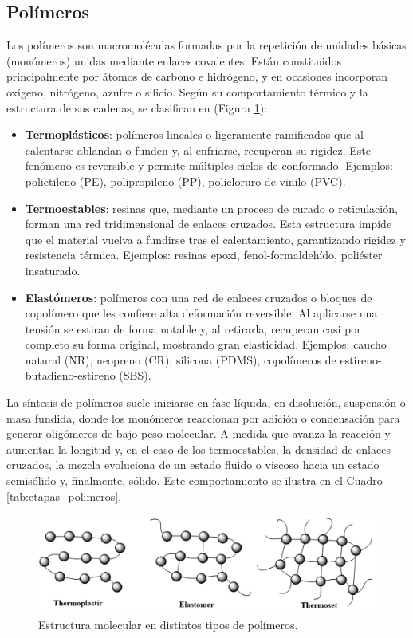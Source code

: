 \subsection{Polímeros}

Los polímeros son macromoléculas formadas por la repetición de unidades básicas (monómeros) unidas mediante enlaces covalentes. Están constituidos principalmente por átomos de carbono e hidrógeno, y en ocasiones incorporan oxígeno, nitrógeno, azufre o silicio. Según su comportamiento térmico y la estructura de sus cadenas, se clasifican en (Figura \ref{plmrs}):

\begin{itemize}
  \item \textbf{Termoplásticos}: polímeros lineales o ligeramente ramificados que al calentarse ablandan o funden y, al enfriarse, recuperan su rigidez. Este fenómeno es reversible y permite múltiples ciclos de conformado. Ejemplos: polietileno (PE), polipropileno (PP), policloruro de vinilo (PVC).
  \item \textbf{Termoestables}: resinas que, mediante un proceso de curado o reticulación, forman una red tridimensional de enlaces cruzados. Esta estructura impide que el material vuelva a fundirse tras el calentamiento, garantizando rigidez y resistencia térmica. Ejemplos: resinas epoxi, fenol-formaldehído, poliéster insaturado.
  \item \textbf{Elastómeros}: polímeros con una red de enlaces cruzados o bloques de copolímero que les confiere alta deformación reversible. Al aplicarse una tensión se estiran de forma notable y, al retirarla, recuperan casi por completo su forma original, mostrando gran elasticidad. Ejemplos: caucho natural (NR), neopreno (CR), silicona (PDMS), copolímeros de estireno-butadieno-estireno (SBS).
\end{itemize}

La síntesis de polímeros suele iniciarse en fase líquida, en disolución, suspensión o masa fundida, donde los monómeros reaccionan por adición o condensación para generar oligómeros de bajo peso molecular. A medida que avanza la reacción y aumentan la longitud y, en el caso de los termoestables, la densidad de enlaces cruzados, la mezcla evoluciona de un estado fluido o viscoso hacia un estado semisólido y, finalmente, sólido. Este comportamiento se ilustra en el Cuadro \ref{tab:etapas_polimeros}.

\begin{figure}[h!]
    \centering
    \includegraphics[width=1.0\linewidth]{imgs/elastomer.png}
    \caption{Estructura molecular en distintos tipos de polímeros.}
    \label{plmrs}
\end{figure}

